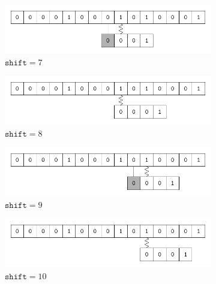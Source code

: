 \begin{description}
\begin{ex}
\begin{figure}[H]
      \begin{subfigure}[t]{.45\textwidth}
        \centering
        \includegraphics[scale=.6]{img/32_1-1/32_1-1_8.pdf}
        \caption{$\texttt{shift} = 7$}\label{fig:32_1-1_8}
      \end{subfigure}
      \begin{subfigure}[t]{.45\textwidth}
        \centering
        \includegraphics[scale=.6]{img/32_1-1/32_1-1_9.pdf}
        \caption{$\texttt{shift} = 8$}\label{fig:32_1-1_9}
      \end{subfigure}
      \begin{subfigure}[t]{.45\textwidth}
        \centering
        \includegraphics[scale=.6]{img/32_1-1/32_1-1_10.pdf}
        \caption{$\texttt{shift} = 9$}\label{fig:32_1-1_10}
      \end{subfigure}
      \begin{subfigure}[t]{.45\textwidth}
        \centering
        \includegraphics[scale=.6]{img/32_1-1/32_1-1_11.pdf}
        \caption{$\texttt{shift} = 10$}\label{fig:32_1-1_11}
      \end{subfigure}
      \begin{subfigure}[t]{.45\textwidth}

\end{subfigure}
\end{figure}
\end{ex}
\end{description}
